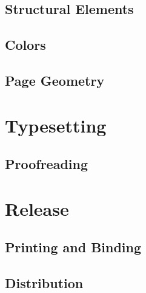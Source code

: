 \documentclass[
  a5paper,10pt,           %
  dvipsnames              %
]{book}
\begin{document}
\section{Structural Elements}
\section{Colors}
\section{Page Geometry}

\chapter{Typesetting}

\section{Proofreading}

\chapter{Release}
\section{Printing and Binding}
\section{Distribution}
\backmatter

\printbibliography[heading=bibintoc]

\printacronyms[heading=none]

\cleardoublepage
\def\index#1{} %
\printindex    %
\end{document}
